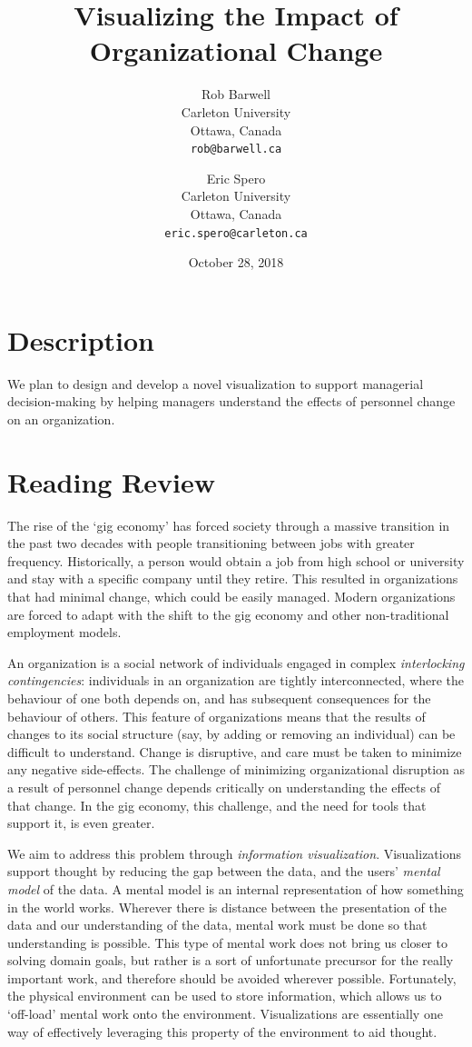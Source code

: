 \documentclass[12pt,letterpaper]{article}
\title{Visualizing the Impact of Organizational Change}
\author{
  Rob Barwell\\ %
  \small \vspace{-.15cm}Carleton University\\
  \small Ottawa, Canada\\
  \small \texttt{rob@barwell.ca}
  \and
  Eric Spero\\ %
  \small \vspace{-.15cm}Carleton University\\
  \small Ottawa, Canada\\
  \small \texttt{eric.spero@carleton.ca}
}
\date{October 28, 2018}
\begin{document}
\maketitle

\section{Description}

We plan to design and develop a novel visualization to support managerial decision-making by helping managers understand the effects of personnel change on an organization.

\section{Reading Review}

The rise of the \lq gig economy\rq{}\cite{de2015rise,friedman2014workers} has forced society through a massive transition in the past two decades with people transitioning between jobs with greater frequency.  Historically, a person would obtain a job from high school or university and stay with a specific company until they retire.  This resulted in organizations that had minimal change, which could be easily managed. Modern organizations are forced to adapt with the shift to the gig economy and other non-traditional employment models.  

An organization is a social network\cite{scott1988social} of individuals engaged in complex \emph{interlocking contingencies}\cite{glenn2006complexity}: individuals in an organization are tightly interconnected, where the behaviour of one both depends on, and has subsequent consequences for the behaviour of others\cite{glenn2006complexity}. This feature of organizations means that the results of changes to its social structure (say, by adding or removing an individual) can be difficult to understand. Change is disruptive, and care must be taken to minimize any negative side-effects. The challenge of minimizing organizational disruption as a result of personnel change depends critically on understanding the effects of that change. In the gig economy, this challenge, and the need for tools that support it, is even greater. 

We aim to address this problem through \emph{information visualization}. Visualizations support thought by reducing the gap between the data, and the users' \emph{mental model} of the data\cite{yi2007toward}. A mental model is an internal representation of how something in the world works\cite{staggersmodel,norman2014some}. Wherever there is distance between the presentation of the data and our understanding of the data, mental work must be done so that understanding is possible. This type of mental work does not bring us closer to solving domain goals, but rather is a sort of unfortunate precursor for the really important work, and therefore should be avoided wherever possible\cite{paas2003cognitive}. Fortunately, the physical environment can be used to store information, which allows us to \lq off-load\rq{} mental work onto the environment\cite{wilson2002six}. Visualizations are essentially one way of effectively leveraging this property of the environment to aid thought.
\end{document}

